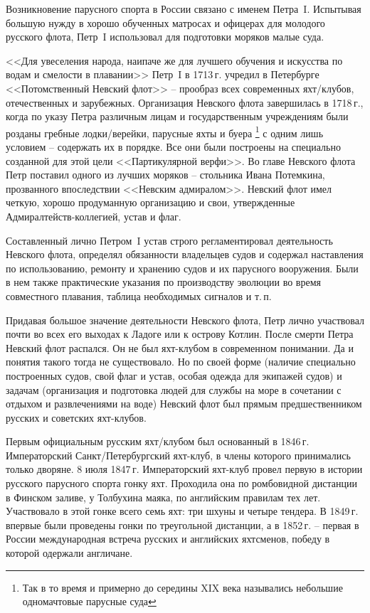 \documentclass[a4paper, 12pt, twoside, final]{scrbook}
\begin{document}
Возникновение парусного спорта в России связано с именем Петра~I.
Испытывая большую нужду в хорошо обученных матросах и офицерах для
молодого русского флота, Петр~I использовал для подготовки моряков
малые суда.

<<Для увеселения народа, наипаче же для лучшего обучения и искусства
по водам и смелости в плавании>> Петр~I в 1713\,г. учредил в Петербурге
<<Потомственный Невский флот>> \--- прообраз всех современных яхт\-/клубов,
отечественных и зарубежных. Организация Невского флота завершилась
в 1718\,г., когда по указу Петра различным лицам и государственным
учреждениям были розданы гребные лодки\-/верейки, парусные яхты и буера%
\footnote{Так в то время и примерно до середины XIX века назывались небольшие
одномачтовые парусные суда}
с одним лишь условием \--- содержать их в порядке. Все они были построены
на специально созданной для этой цели <<Партикулярной верфи>>. Во главе
Невского флота Петр поставил одного из лучших моряков \--- стольника
Ивана Потемкина, прозванного впоследствии <<Невским адмиралом>>. Невский
флот имел четкую, хорошо продуманную организацию и свои, утвержденные
Адмиралтейств-коллегией, устав и флаг.

Составленный лично Петром~I устав строго регламентировал деятельность
Невского флота, определял обязанности владельцев судов и содержал
наставления по использованию, ремонту и хранению судов и их парусного
вооружения. Были в нем также практические указания по производству
эволюции во время совместного плавания, таблица необходимых сигналов
и т.\,п.

Придавая большое значение деятельности Невского флота, Петр лично
участвовал почти во всех его выходах к Ладоге или к острову Котлин.
После смерти Петра Невский флот распался. Он не был яхт-клубом в современном
понимании. Да и понятия такого тогда не существовало. Но по своей
форме (наличие специально построенных судов, свой флаг и устав, особая
одежда для экипажей судов) и задачам (организация и подготовка людей
для службы на море в сочетании с отдыхом и развлечениями на воде)
Невский флот был прямым предшественником русских и советских яхт-клубов.

Первым официальным русским яхт\-/клубом был основанный в 1846\,г. Императорский
Санкт\-/Петербургский яхт-клуб, в члены которого принимались только
дворяне. 8 июля 1847\,г. Императорский яхт-клуб провел первую в истории
русского парусного спорта гонку яхт. Проходила она по ромбовидной
дистанции в Финском заливе, у Толбухина маяка, по английским правилам
тех лет. Участвовало в этой гонке всего семь яхт: три шхуны и четыре
тендера. В 1849\,г. впервые были проведены гонки по треугольной дистанции,
а в 1852\,г. \--- первая в России международная встреча русских и английских
яхтсменов, победу в которой одержали англичане.{\sloppy\par}
\end{document}
